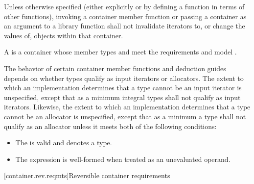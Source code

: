 \pnum
Unless otherwise specified (either explicitly or by defining a
function in terms of other functions), invoking a container member
function or passing a container as an argument to a library function
shall not invalidate iterators to, or change the values of, objects
within that container.

\pnum
A 
is a container
whose member types  and 
meet the
 requirements and
model .

\pnum
The behavior of certain container member functions and deduction guides
depends on whether types qualify as input iterators or allocators.
The extent to which an implementation determines that a type cannot be an input
iterator is unspecified, except that as a minimum integral types shall not qualify
as input iterators.
Likewise, the extent to which an implementation determines that a type cannot be
an allocator is unspecified, except that as a minimum a type  shall not qualify
as an allocator unless it meets both of the following conditions:

\begin{itemize}
\item The  
is valid and denotes a type.

\item The expression 
is well-formed when treated as an unevaluated operand.
\end{itemize}

[container.rev.reqmts]{Reversible container requirements}

\renewcommand{\indexcont}[1]{%
\indexlibrarymisc{\idxcode{#1}}{reversible containers}%
\indexlibrarymemberx{array}{#1}%
\indexlibrarymemberx{deque}{#1}%
\indexlibrarymemberx{hive}{#1}%
\indexlibrarymemberx{list}{#1}%
\indexlibrarymemberx{vector}{#1}%
\indexlibrarymemberx{map}{#1}%
\indexlibrarymemberx{set}{#1}%
\indexlibrarymemberx{multiset}{#1}%
\indexlibrarymemberx{multimap}{#1}%
\indexlibrarymemberx{unordered_map}{#1}%
\indexlibrarymemberx{unordered_set}{#1}%
\indexlibrarymemberx{unordered_multiset}{#1}%
\indexlibrarymemberx{unordered_multimap}{#1}%
\indexlibrarymemberx{flat_map}{#1}%
\indexlibrarymemberx{flat_set}{#1}%
\indexlibrarymemberx{flat_multiset}{#1}%
\indexlibrarymemberx{flat_multimap}{#1}%
}

